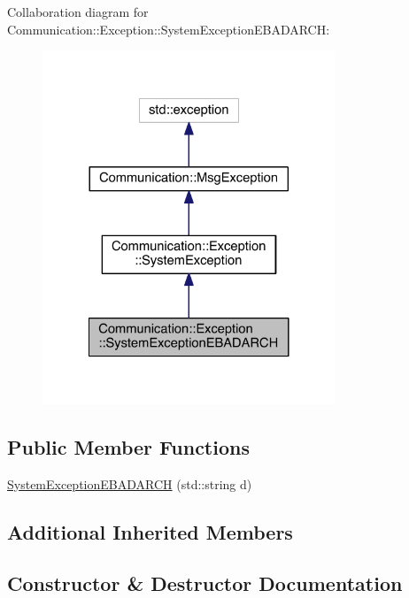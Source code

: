 Collaboration diagram for Communication\+:\+:Exception\+:\+:System\+Exception\+E\+B\+A\+D\+A\+R\+C\+H\+:\nopagebreak
\begin{figure}[H]
\begin{center}
\leavevmode
\includegraphics[width=248pt]{class_communication_1_1_exception_1_1_system_exception_e_b_a_d_a_r_c_h__coll__graph}
\end{center}
\end{figure}
\subsection*{Public Member Functions}
\begin{DoxyCompactItemize}
\item 
\hyperlink{class_communication_1_1_exception_1_1_system_exception_e_b_a_d_a_r_c_h_a89cf9ad70243aa56447d7273c68d1901}{System\+Exception\+E\+B\+A\+D\+A\+R\+C\+H} (std\+::string d)
\end{DoxyCompactItemize}
\subsection*{Additional Inherited Members}


\subsection{Constructor \& Destructor Documentation}
\hypertarget{class_communication_1_1_exception_1_1_system_exception_e_b_a_d_a_r_c_h_a89cf9ad70243aa56447d7273c68d1901}{}
